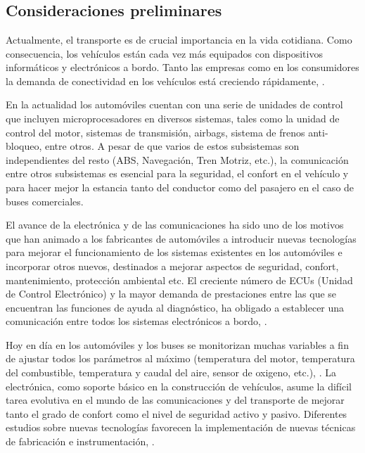 \chapter[Capítulo 1. Introducción]{}

\section{Consideraciones preliminares}

Actualmente, el transporte es de crucial importancia en la vida cotidiana. Como consecuencia, los vehículos están cada vez más equipados con dispositivos informáticos y electrónicos a bordo. Tanto las empresas como en los consumidores la demanda de conectividad en los vehículos está creciendo rápidamente, \cite{VWC}.

En la actualidad los automóviles cuentan con una serie de unidades de control que incluyen microprocesadores en diversos sistemas, tales como la unidad de control del motor, sistemas de transmisión, airbags, sistema de frenos anti-bloqueo, entre otros. A pesar de que varios de estos subsistemas son independientes del resto (ABS, Navegación, Tren Motriz, etc.), la comunicación entre otros subsistemas es esencial para la seguridad, el confort en el vehículo y para hacer mejor la estancia tanto del conductor como del pasajero en el caso de buses comerciales.

 El avance de la electrónica y de las comunicaciones ha sido uno de los motivos que han animado a los fabricantes de automóviles a introducir nuevas tecnologías para mejorar el funcionamiento de los sistemas existentes en los automóviles e incorporar otros nuevos, destinados a mejorar aspectos de seguridad, confort, mantenimiento, protección ambiental etc. El creciente número de ECUs  (Unidad de Control Electrónico) y la mayor demanda de prestaciones entre las que se encuentran las funciones de ayuda al diagnóstico, ha obligado a establecer una comunicación entre todos los sistemas electrónicos a bordo,  \cite{EA}.

Hoy en día en los automóviles y los buses se monitorizan muchas variables a fin de ajustar todos los parámetros al máximo (temperatura del motor, temperatura del combustible, temperatura y caudal del aire, sensor de oxigeno, etc.), \cite{DUCE}. La electrónica, como soporte básico en la construcción de vehículos, asume la difícil tarea evolutiva en el mundo de las comunicaciones y del transporte de  mejorar tanto el grado de confort como el nivel de seguridad activo y pasivo. Diferentes estudios sobre nuevas tecnologías favorecen la implementación de nuevas técnicas de fabricación e instrumentación, \cite{TSA}.



